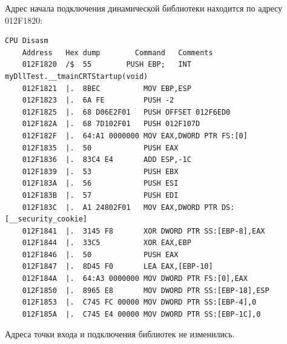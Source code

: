 Адрес начала подключения динамической библиотеки находится по адресу 012F1820:
\begin{Verbatim}[frame=single]
	CPU Disasm
	Address   Hex dump        Command   Comments
	012F1820  /$  55        PUSH EBP;   INT myDllTest.__tmainCRTStartup(void)
	012F1821  |.  8BEC          MOV EBP,ESP
	012F1823  |.  6A FE         PUSH -2
	012F1825  |.  68 D06E2F01   PUSH OFFSET 012F6ED0
	012F182A  |.  68 7D102F01   PUSH 012F107D
	012F182F  |.  64:A1 0000000 MOV EAX,DWORD PTR FS:[0]
	012F1835  |.  50            PUSH EAX
	012F1836  |.  83C4 E4       ADD ESP,-1C
	012F1839  |.  53            PUSH EBX
	012F183A  |.  56            PUSH ESI
	012F183B  |.  57            PUSH EDI
	012F183C  |.  A1 24802F01   MOV EAX,DWORD PTR DS:[__security_cookie]
	012F1841  |.  3145 F8       XOR DWORD PTR SS:[EBP-8],EAX
	012F1844  |.  33C5          XOR EAX,EBP
	012F1846  |.  50            PUSH EAX
	012F1847  |.  8D45 F0       LEA EAX,[EBP-10]
	012F184A  |.  64:A3 0000000 MOV DWORD PTR FS:[0],EAX
	012F1850  |.  8965 E8       MOV DWORD PTR SS:[EBP-18],ESP
	012F1853  |.  C745 FC 00000 MOV DWORD PTR SS:[EBP-4],0
	012F185A  |.  C745 E4 00000 MOV DWORD PTR SS:[EBP-1C],0
\end{Verbatim}
Адреса точки входа и подключения библиотек не изменились.

